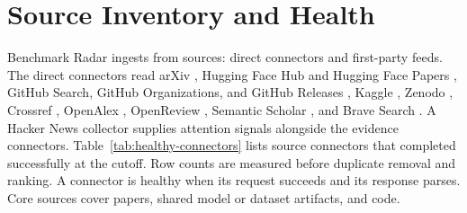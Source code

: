 \documentclass[11pt]{article}
\begin{document}
\section{Source Inventory and Health}
\label{app:source-inventory}

Benchmark Radar ingests from \ReportIngestSourceCount{} sources: \ReportConnectorCount{} direct connectors and \ReportFirstPartyFeedCount{} first-party feeds. The direct connectors read arXiv \citep{arxivapi}, Hugging Face Hub and Hugging Face Papers \citep{huggingfacehub}, GitHub Search, GitHub Organizations, and GitHub Releases \citep{githubsearchdocs,githubreleasesdocs}, Kaggle \citep{kaggleapi}, Zenodo \citep{zenodoapi}, Crossref \citep{crossrefapi}, OpenAlex \citep{priem2022openalex}, OpenReview \citep{openreview}, Semantic Scholar \citep{kinney2023semanticscholar}, and Brave Search \citep{bravesearchapi}. A Hacker News collector \citep{hnalgoliaapi} supplies attention signals alongside the evidence connectors. Table~\ref{tab:healthy-connectors} lists source connectors that completed successfully at the cutoff. Row counts are measured before duplicate removal and ranking. A connector is healthy when its request succeeds and its response parses. Core sources cover papers, shared model or dataset artifacts, and code.
\end{document}
